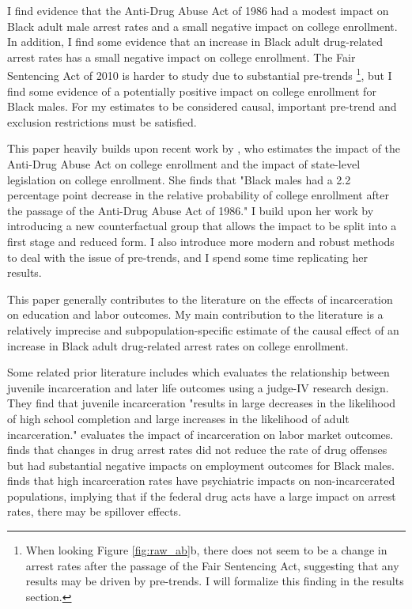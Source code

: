 \documentclass{article}
\begin{document}

I find evidence that the Anti-Drug Abuse Act of 1986 had a modest impact on Black adult male arrest rates and a small negative impact on college enrollment. In addition, I find some evidence that an increase in Black adult drug-related arrest rates has a small negative impact on college enrollment. The Fair Sentencing Act of 2010 is harder to study due to substantial pre-trends \footnote{When looking Figure \ref{fig:raw_ab}b, there does not seem to be a change in arrest rates after the passage of the Fair Sentencing Act, suggesting that any results may be driven by pre-trends. I will formalize this finding in the results section.}, but I find some evidence of a potentially positive impact on college enrollment for Black males. For my estimates to be considered causal, important pre-trend and exclusion restrictions must be satisfied.

This paper heavily builds upon recent work by \cite{britton2022}, who estimates the impact of the Anti-Drug Abuse Act on college enrollment and the impact of state-level legislation on college enrollment. She finds that "Black males had a 2.2 percentage point decrease in the relative probability of college enrollment after the passage of the Anti-Drug Abuse Act of 1986." I build upon her work by introducing a new counterfactual group that allows the impact to be split into a first stage and reduced form. I also introduce more modern and robust methods to deal with the issue of pre-trends, and I spend some time replicating her results.

This paper generally contributes to the literature on the effects of incarceration on education and labor outcomes. My main contribution to the literature is a relatively imprecise and subpopulation-specific estimate of the causal effect of an increase in Black adult drug-related arrest rates on college enrollment.

Some related prior literature includes \cite{aizer} which evaluates the relationship between juvenile incarceration and later life outcomes using a judge-IV research design. They find that juvenile incarceration "results in large decreases in the likelihood of high school completion and large increases in the likelihood of adult incarceration." \cite{western} evaluates the impact of incarceration on labor market outcomes. \cite{mitchell2016effect} finds that changes in drug arrest rates did not reduce the rate of drug offenses but had substantial negative impacts on employment outcomes for Black males. \cite{hatzenbuehler2015collateral} finds that high incarceration rates have psychiatric impacts on non-incarcerated populations, implying that if the federal drug acts have a large impact on arrest rates, there may be spillover effects.
\end{document}
